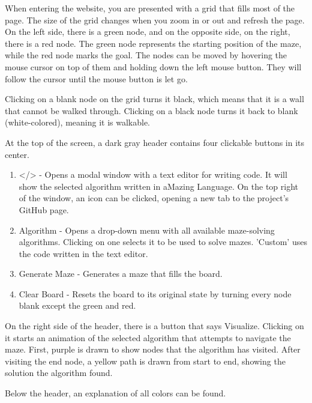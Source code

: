 When entering the website, you are presented with a grid that fills most of the page. The size of the grid changes when you zoom in or out and refresh the page. On the left side, there is a green node, and on the opposite side, on the right, there is a red node. The green node represents the starting position of the maze, while the red node marks the goal. The nodes can be moved by hovering the mouse cursor on top of them and holding down the left mouse button. They will follow the cursor until the mouse button is let go.

Clicking on a blank node on the grid turns it black, which means that it is a wall that cannot be walked through. Clicking on a black node turns it back to blank (white-colored), meaning it is walkable.

At the top of the screen, a dark gray header contains four clickable buttons in its center.

\begin{enumerate}
    \item </> - Opens a modal window with a text editor for writing code. It will show the selected algorithm written in aMazing Language. On the top right of the window, an icon can be clicked, opening a new tab to the project's GitHub page.
    \item Algorithm - Opens a drop-down menu with all available maze-solving algorithms. Clicking on one selects it to be used to solve mazes. 'Custom' uses the code written in the text editor.
    \item Generate Maze - Generates a maze that fills the board.
    \item Clear Board - Resets the board to its original state by turning every node blank except the green and red.
\end{enumerate}

On the right side of the header, there is a button that says Visualize. Clicking on it starts an animation of the selected algorithm that attempts to navigate the maze. First, purple is drawn to show nodes that the algorithm has visited. After visiting the end node, a yellow path is drawn from start to end, showing the solution the algorithm found.

Below the header, an explanation of all colors can be found.
